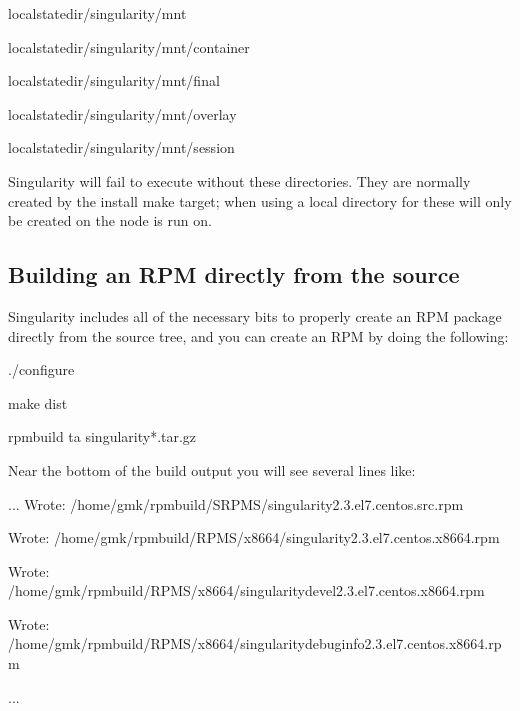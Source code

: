 \documentclass[letterpaper,10pt,english]{sphinxmanual}
\begin{document}
%
\begin{sphinxVerbatim}[commandchars=\\\{\}]
\PYGZdl{}\PYGZob{}localstatedir\PYGZcb{}/singularity/mnt

\PYGZdl{}\PYGZob{}localstatedir\PYGZcb{}/singularity/mnt/container

\PYGZdl{}\PYGZob{}localstatedir\PYGZcb{}/singularity/mnt/final

\PYGZdl{}\PYGZob{}localstatedir\PYGZcb{}/singularity/mnt/overlay

\PYGZdl{}\PYGZob{}localstatedir\PYGZcb{}/singularity/mnt/session
\end{sphinxVerbatim}

Singularity will fail to execute without these directories. They are
normally created by the install make target; when using a local
directory for  these will only be created on the node  is run on.


\subsection{Building an RPM directly from the source}
\label{\detokenize{admin_quickstart:building-an-rpm-directly-from-the-source}}
Singularity includes all of the necessary bits to properly create an RPM
package directly from the source tree, and you can create an RPM by
doing the following:

%
\begin{sphinxVerbatim}[commandchars=\\\{\}]
\PYGZdl{} ./configure

\PYGZdl{} make dist

\PYGZdl{} rpmbuild \PYGZhy{}ta singularity\PYGZhy{}*.tar.gz
\end{sphinxVerbatim}

Near the bottom of the build output you will see several lines like:

%
\begin{sphinxVerbatim}[commandchars=\\\{\}]
...
Wrote: /home/gmk/rpmbuild/SRPMS/singularity\PYGZhy{}2.3.el7.centos.src.rpm

Wrote: /home/gmk/rpmbuild/RPMS/x86\PYGZus{}64/singularity\PYGZhy{}2.3.el7.centos.x86\PYGZus{}64.rpm

Wrote: /home/gmk/rpmbuild/RPMS/x86\PYGZus{}64/singularity\PYGZhy{}devel\PYGZhy{}2.3.el7.centos.x86\PYGZus{}64.rpm

Wrote: /home/gmk/rpmbuild/RPMS/x86\PYGZus{}64/singularity\PYGZhy{}debuginfo\PYGZhy{}2.3.el7.centos.x86\PYGZus{}64.rpm

...
\end{sphinxVerbatim}
\end{document}

